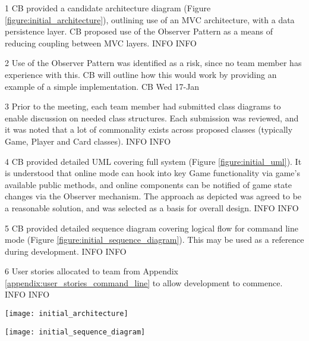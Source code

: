 \begin{momitems}
	\momitem
	{1}
	{CB provided a candidate architecture diagram (Figure \ref{figure:initial_architecture}), outlining use of an MVC architecture, with a data persistence layer. 
	CB proposed use of the Observer Pattern as a means of reducing coupling between MVC layers.}
	{INFO}
	{INFO}

	\momitem
	{2}
	{Use of the Observer Pattern was identified as a risk, since no team member has experience with this. 
	CB will outline how this would work by providing an example of a simple implementation.}
	{CB}
	{Wed 17-Jan}

	\momitem
	{3}
	{Prior to the meeting, each team member had submitted class diagrams to enable discussion on needed class structures. 
	Each submission was reviewed, and it was noted that a lot of commonality exists across proposed classes (typically Game, Player and Card classes).}
	{INFO}
	{INFO}

	\momitem
	{4}
	{CB provided detailed UML covering full system (Figure \ref{figure:initial_uml}). 
	It is understood that online mode can hook into key Game functionality via game's available public methods, and online components can be notified of game state changes via the Observer mechanism. 
	The approach as depicted was agreed to be a reasonable solution, and was selected as a basis for overall design.}
	{INFO}
	{INFO}

	\momitem
	{5}
	{CB provided detailed sequence diagram covering logical flow for command line mode (Figure \ref{figure:initial_sequence_diagram}). 
	This may be used as a reference during development.}
	{INFO}
	{INFO}

	\momitem
	{6}
	{User stories allocated to team from Appendix \ref{appendix:user_stories_command_line} to allow development to commence.}
	{INFO}
	{INFO}
\end{momitems}

\begin{center}
	\texttt{[image: initial\_architecture]}
	\label{figure:initial_architecture}
\end{center}

\begin{center}
	\label{figure:initial_uml}
\end{center}

\begin{center}
	\texttt{[image: initial\_sequence\_diagram]}
	\label{figure:initial_sequence_diagram}
\end{center}


